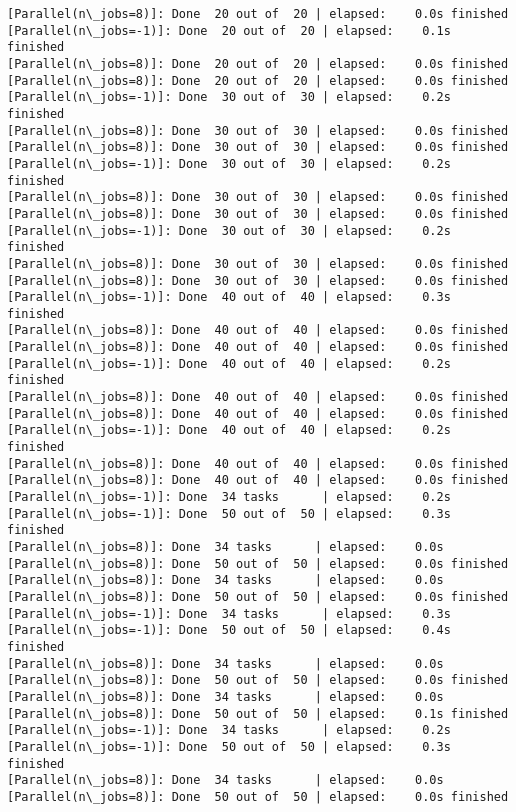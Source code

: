 \documentclass[11pt]{article}
\begin{document}
\begin{Verbatim}[commandchars=\\\{\}]
[Parallel(n\_jobs=8)]: Done  20 out of  20 | elapsed:    0.0s finished
[Parallel(n\_jobs=-1)]: Done  20 out of  20 | elapsed:    0.1s finished
[Parallel(n\_jobs=8)]: Done  20 out of  20 | elapsed:    0.0s finished
[Parallel(n\_jobs=8)]: Done  20 out of  20 | elapsed:    0.0s finished
[Parallel(n\_jobs=-1)]: Done  30 out of  30 | elapsed:    0.2s finished
[Parallel(n\_jobs=8)]: Done  30 out of  30 | elapsed:    0.0s finished
[Parallel(n\_jobs=8)]: Done  30 out of  30 | elapsed:    0.0s finished
[Parallel(n\_jobs=-1)]: Done  30 out of  30 | elapsed:    0.2s finished
[Parallel(n\_jobs=8)]: Done  30 out of  30 | elapsed:    0.0s finished
[Parallel(n\_jobs=8)]: Done  30 out of  30 | elapsed:    0.0s finished
[Parallel(n\_jobs=-1)]: Done  30 out of  30 | elapsed:    0.2s finished
[Parallel(n\_jobs=8)]: Done  30 out of  30 | elapsed:    0.0s finished
[Parallel(n\_jobs=8)]: Done  30 out of  30 | elapsed:    0.0s finished
[Parallel(n\_jobs=-1)]: Done  40 out of  40 | elapsed:    0.3s finished
[Parallel(n\_jobs=8)]: Done  40 out of  40 | elapsed:    0.0s finished
[Parallel(n\_jobs=8)]: Done  40 out of  40 | elapsed:    0.0s finished
[Parallel(n\_jobs=-1)]: Done  40 out of  40 | elapsed:    0.2s finished
[Parallel(n\_jobs=8)]: Done  40 out of  40 | elapsed:    0.0s finished
[Parallel(n\_jobs=8)]: Done  40 out of  40 | elapsed:    0.0s finished
[Parallel(n\_jobs=-1)]: Done  40 out of  40 | elapsed:    0.2s finished
[Parallel(n\_jobs=8)]: Done  40 out of  40 | elapsed:    0.0s finished
[Parallel(n\_jobs=8)]: Done  40 out of  40 | elapsed:    0.0s finished
[Parallel(n\_jobs=-1)]: Done  34 tasks      | elapsed:    0.2s
[Parallel(n\_jobs=-1)]: Done  50 out of  50 | elapsed:    0.3s finished
[Parallel(n\_jobs=8)]: Done  34 tasks      | elapsed:    0.0s
[Parallel(n\_jobs=8)]: Done  50 out of  50 | elapsed:    0.0s finished
[Parallel(n\_jobs=8)]: Done  34 tasks      | elapsed:    0.0s
[Parallel(n\_jobs=8)]: Done  50 out of  50 | elapsed:    0.0s finished
[Parallel(n\_jobs=-1)]: Done  34 tasks      | elapsed:    0.3s
[Parallel(n\_jobs=-1)]: Done  50 out of  50 | elapsed:    0.4s finished
[Parallel(n\_jobs=8)]: Done  34 tasks      | elapsed:    0.0s
[Parallel(n\_jobs=8)]: Done  50 out of  50 | elapsed:    0.0s finished
[Parallel(n\_jobs=8)]: Done  34 tasks      | elapsed:    0.0s
[Parallel(n\_jobs=8)]: Done  50 out of  50 | elapsed:    0.1s finished
[Parallel(n\_jobs=-1)]: Done  34 tasks      | elapsed:    0.2s
[Parallel(n\_jobs=-1)]: Done  50 out of  50 | elapsed:    0.3s finished
[Parallel(n\_jobs=8)]: Done  34 tasks      | elapsed:    0.0s
[Parallel(n\_jobs=8)]: Done  50 out of  50 | elapsed:    0.0s finished

\end{Verbatim}
\end{document}
